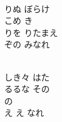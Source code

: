 \documentclass[10pt,b5j]{tarticle} %
\begin{document}
\begin{enumerate}
\begin{minipage}[c]{\blocksize}
    \end{minipage}
    \begin{minipage}[c]{\blocksize}
        
        \vspace{\linespace}
        \item~\\
        りぬ ぼらけ\\
        こめ き\\
        りを りたまえ\\
        ぞの みなれ
        
    \end{minipage}
    \begin{minipage}[c]{\blocksize}
        
        \vspace{\linespace}
        \item~\\
        しき々 はた\\
        るるな その\\
        の \\
        え え なれ

    
    \end{minipage}
\end{enumerate} %
\end{document}
